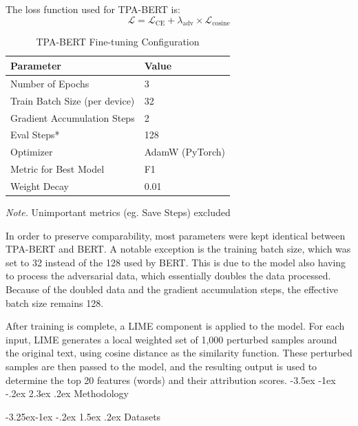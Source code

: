 \documentclass[
]{article}
\makeatletter
\renewcommand\section{\@startsection{section}{1}{\z@}%
  {-3.5ex \@plus -1ex \@minus -.2ex}%
  {2.3ex \@plus .2ex}%
  {\normalfont\fontsize{12}{14}\selectfont\bfseries}}
\renewcommand\subsection{\@startsection{subsection}{2}{\z@}%
  {-3.25ex\@plus -1ex \@minus -.2ex}%
  {1.5ex \@plus .2ex}%
  {\normalfont\fontsize{10}{12}\selectfont\bfseries}}
\makeatother
\begin{document}
The loss function used for TPA-BERT is:
\begin{equation}
\mathcal{L} = \mathcal{L}_{\text{CE}} + \lambda_{\text{adv}} \times \mathcal{L}_{\text{cosine}}
\label{eq:tpa_bert_loss}
\end{equation}

\begin{table}[H]
    \centering
    \caption{TPA-BERT Fine-tuning Configuration}
    \label{tab:tpa_bert_finetune_config}
    \begin{tabular}{l l}
        \hline
        \textbf{Parameter} & \textbf{Value} \\
        \hline
        Number of Epochs & 3 \\
        Train Batch Size (per device) & 32 \\
        Gradient Accumulation Steps & 2 \\
        Eval Steps* & 128 \\
        Optimizer & AdamW (PyTorch) \\
        Metric for Best Model & F1 \\
        Weight Decay & 0.01 \\
        \hline
    \end{tabular}
    \footnotesize{\textit{Note.} Unimportant metrics (eg. Save Steps) excluded}
\end{table}

In order to preserve comparability, most parameters were kept identical between TPA-BERT and BERT. A notable exception is the training batch size, which was set to 32 instead of the 128 used by BERT. This is due to the model also having to process the adversarial data, which essentially doubles the data processed. Because of the doubled data and the gradient accumulation steps, the effective batch size remains 128. 

After training is complete, a LIME component is applied to the model. For each input, LIME generates a local weighted set of 1,000 perturbed samples around the original text, using cosine distance as the similarity function. These perturbed samples are then passed to the model, and the resulting output is used to determine the top 20 features (words) and their attribution scores.
\section{Methodology}

\subsection{Datasets}
\end{document}

